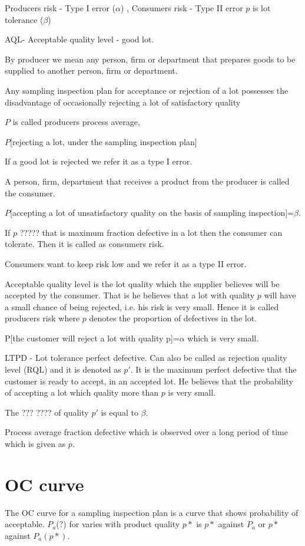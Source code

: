 \documentclass[oneside,11pt,pdftex]{book}%
\numberwithin{equation}{section}
\numberwithin{section}{chapter}
\numberwithin{equation}{chapter}
\begin{document}
Producers risk - Type I error ($ \alpha  $)
, Consumers risk - Type II error $ p $ is lot tolerance ($ \beta $)

AQL- Acceptable quality level - good lot.


By producer we mean any person, firm or department that prepares goods to be supplied to another person, firm or department.

Any sampling inspection plan for acceptance or rejection of a lot possesses the disadvantage of occasionally rejecting a lot of satisfactory quality

$ P $ is called producers process average,

$ P $[rejecting a lot, under the sampling inspection plan]

If a good lot is rejected we refer it as a type I error.

A person, firm, department that receives a product from the producer is called the consumer.

$ P $[accepting a lot of unsatisfactory quality on the basis of sampling inspection]=$ \beta $.

If $ p $ ????? that is maximum fraction defective in a lot then the consumer can tolerate. Then it is called as consumers risk.

Consumers want to keep risk low and we refer it as a type II error.

Acceptable quality level is the lot quality which the supplier believes will be accepted by the consumer. That is he believes that a lot with quality $ p $ will have a small chance of being rejected, i.e. his risk is very small. Hence it is called producers risk where $ p $ denotes the proportion of defectives in the lot.

P[the customer will reject a lot with quality p]=$ \alpha $ which is very small.

LTPD - Lot tolerance perfect defective. Can also be called as rejection quality level (RQL) and it is denoted as $ p' $. It is the maximum perfect defective that the customer is ready to accept, in an accepted lot. He believes that the probability of accepting a lot which quality more than $ p $ is very small.

The ??? ???? of quality $ p' $ is equal to $ \beta  $.

Process average fraction defective which is observed over a long period of time which is given as $ \overline{p} $.

\section{OC curve}
The OC curve for a sampling inspection plan is a curve that shows probability of acceptable. $ P_a $(?) for varies with product quality $ p* $ is $ p* $ against $ P_a $ or $ p* $ against $ P_a(p*) $.
\end{document}
